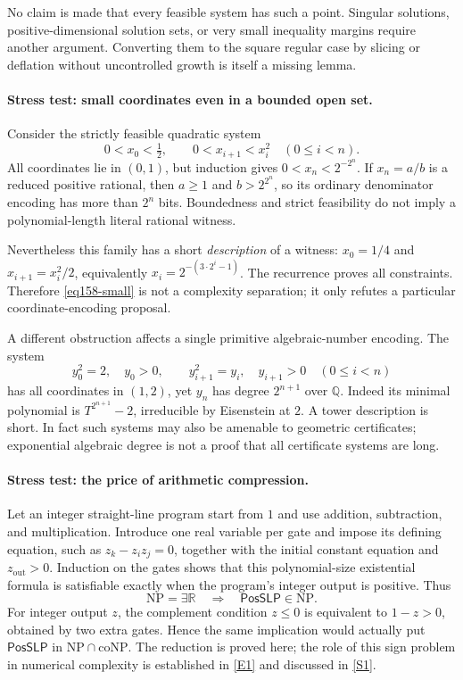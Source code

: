 \documentclass[11pt,a4paper]{article}
\newcommand{\Q}{\mathbb{Q}}
\newcommand{\R}{\mathbb{R}}
\newcommand{\sref}[2]{\hyperlink{source:#1:#2}{[S#2]}}
\newcommand{\eref}[2]{\hyperlink{extra:#1:#2}{[E#2]}}
\numberwithin{equation}{section}
\begin{document}
No claim is made that every feasible system has such a point. Singular
solutions, positive-dimensional solution sets, or very small inequality
margins require another argument. Converting them to the square regular
case by slicing or deflation without uncontrolled growth is itself a
missing lemma.

\paragraph{Stress test: small coordinates even in a bounded open set.}
Consider the strictly feasible quadratic system
\begin{equation}\label{eq158-small}
 0<x_0<\tfrac12,\qquad 0<x_{i+1}<x_i^2\quad(0\le i<n).
\end{equation}
All coordinates lie in $(0,1)$, but induction gives
$0<x_n<2^{-2^n}$. If $x_n=a/b$ is a reduced positive rational, then
$a\ge1$ and $b>2^{2^n}$, so its ordinary denominator encoding has more
than $2^n$ bits. Boundedness and strict feasibility do not imply a
polynomial-length literal rational witness.

Nevertheless this family has a short \emph{description} of a witness:
$x_0=1/4$ and $x_{i+1}=x_i^2/2$, equivalently
$x_i=2^{-(3\cdot2^i-1)}$. The recurrence proves all constraints.
Therefore \eqref{eq158-small} is not a complexity separation; it only
refutes a particular coordinate-encoding proposal.

A different obstruction affects a single primitive algebraic-number
encoding. The system
\[
 y_0^2=2,\quad y_0>0,\qquad y_{i+1}^2=y_i,\quad y_{i+1}>0
       \quad(0\le i<n)
\]
has all coordinates in $(1,2)$, yet $y_n$ has degree $2^{n+1}$ over $\Q$.
Indeed its minimal polynomial is $T^{2^{n+1}}-2$, irreducible by
Eisenstein at $2$. A tower description is short. In fact such systems may
also be amenable to geometric certificates; exponential algebraic degree
is not a proof that all certificate systems are long.

\paragraph{Stress test: the price of arithmetic compression.}
Let an integer straight-line program start from $1$ and use addition,
subtraction, and multiplication. Introduce one real variable per gate and
impose its defining equation, such as $z_k-z_i z_j=0$, together with the
initial constant equation and $z_{\mathrm{out}}>0$. Induction on the gates
shows that this polynomial-size existential formula is satisfiable exactly
when the program's integer output is positive. Thus
\begin{equation}\label{eq158-posslp}
 \mathrm{NP}=\exists\R\quad\Longrightarrow\quad
 \textsf{PosSLP}\in\mathrm{NP}.
\end{equation}
For integer output $z$, the complement condition $z\le0$ is equivalent to
$1-z>0$, obtained by two extra gates. Hence the same implication would
actually put $\textsf{PosSLP}$ in $\mathrm{NP}\cap\mathrm{coNP}$.
The reduction is proved here; the role of this sign problem in numerical
complexity is established in \eref{statement}{1} and discussed in
\sref{statement}{1}.
\end{document}
